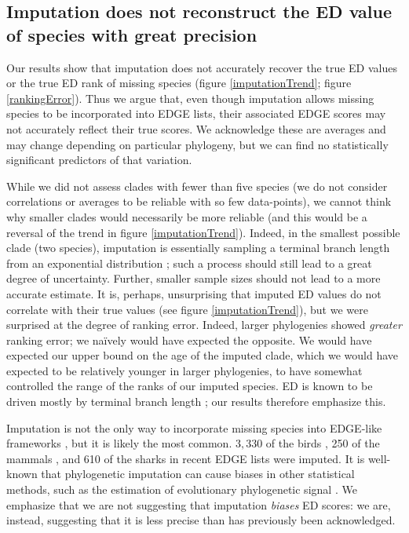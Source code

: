 \documentclass[12pt,english]{article}
\begin{document}
\subsection*{Imputation does not reconstruct the ED value of species with great precision}
Our results show that imputation does not accurately recover the true ED values
or the true ED rank of missing species (figure \ref{imputationTrend}; figure
\ref{rankingError}). Thus we argue that, even though imputation allows missing
species to be incorporated into EDGE lists, their associated EDGE scores may not
accurately reflect their true scores. We acknowledge these are averages and may change depending on particular
phylogeny, but we can find no statistically significant predictors of that
variation.

While we did not assess clades with fewer than five species (we do not consider
correlations or averages to be reliable with so few data-points), we cannot
think why smaller clades would necessarily be more reliable (and this would be a
reversal of the trend in figure \ref{imputationTrend}). Indeed, in the smallest
possible clade (two species), imputation is essentially sampling a terminal
branch length from an exponential distribution \autocite{Kuhn2011}; such a
process should still lead to a great degree of uncertainty. Further, smaller
sample sizes should not lead to a more accurate estimate. It is, perhaps,
unsurprising that imputed ED values do not correlate with their true values (see
figure \ref{imputationTrend}), but we were surprised at the degree of ranking error.
Indeed, larger phylogenies showed \emph{greater} ranking error; we na\"{i}vely
would have expected the opposite. We would have expected our upper bound on the
age of the imputed clade, which we would have expected to be relatively younger
in larger phylogenies, to have somewhat controlled the range of the ranks of our
imputed species. ED is known to be driven mostly by terminal branch length
\autocite{Redding2008, Isaac2007, Steel2007}; our results therefore emphasize
this.

Imputation is not the only way to incorporate missing species into EDGE-like
frameworks \autocite{Gumbs2017, Collen2011}, but it is likely the most common.
$3,330$ of the birds \autocite[\textasciitilde30\%;][]{Jetz2014}, 250 of the mammals
\autocite[\textasciitilde 5.6\%;][]{Collen2011}, and 610 of the sharks
\autocite[\textasciitilde49\%;][]{Stein2018} in recent EDGE lists were imputed.
It is well-known that phylogenetic imputation can cause biases in other
statistical methods, such as the estimation of evolutionary phylogenetic signal
\autocite{Rabosky2014}. We emphasize that we are not suggesting that imputation
\emph{biases} ED scores: we are, instead, suggesting that it is less precise
than has previously been acknowledged.
\end{document}
